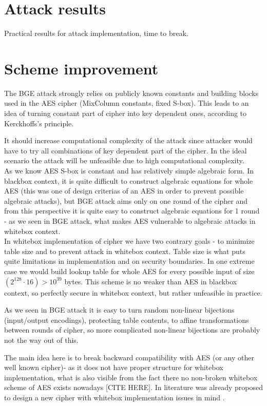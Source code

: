 \documentclass[11pt,oneside,final]{fithesis2}
\begin{document}
    \section{Attack results}
    Practical results for attack implementation, time to break.
    
    \section{Scheme improvement}
    The BGE attack strongly relies on publicly known constants and building blocks used in the AES cipher (MixColumn constants, fixed S-box). 
    This leads to an idea of turning constant part of cipher into key dependent ones, according to Kerckhoffs's principle. 

    It should increase computational complexity of the attack since attacker would have to try
    all combinations of key dependent part of the cipher. In the ideal scenario the attack will be unfeasible due to high computational complexity. \\
    
    As we know AES S-box is constant and has relatively simple algebraic form. In blackbox context, it is quite difficult to construct algebraic equations for whole AES (this was 
    one of design criterias of an AES in order to prevent possible algebraic attacks), but BGE attack aims only on one round of the cipher and from this perspective it is 
    quite easy to construct algebraic equations for 1 round - as we seen in BGE attack, what makes AES vulnerable to algebraic attacks in whitebox context.\\
    
    In whitebox implementation of cipher we have two contrary goals - to minimize table size and to prevent attack in whitebox context. Table size is what puts quite limitations
    in implementation and on security boundaries. In one extreme case we would build lookup table for whole AES for every possible input of size 
    $\left(2^{128} \cdot 16\right) > 10^{39}$ bytes. This 
    scheme is no weaker than AES in blackbox context, so perfectly secure in whitebox context, but rather unfeasible in practice.

    As we seen in BGE attack it is easy to turn random non-linear bijections (input/output encodings), protecting table contents, to affine transformations between rounds of
    cipher, so more complicated non-linear bijections are probably not the way out of this.
    
    The main idea here is to break backward compatibility with AES (or any other well known cipher)- as it does not have proper structure for whitebox implementation, what is 
    also visible from the fact there no non-broken whitebox scheme of AES exists nowadays [CITE HERE]. 
    In literature was already proposed to design a new cipher with whitebox implementation issues in mind \citep{Billet:2004:CWB:2080787.2080809}. 
\end{document}
